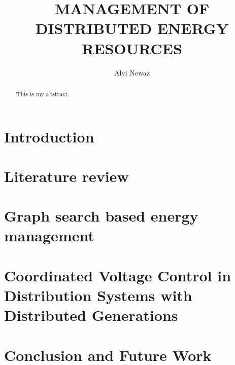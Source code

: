 \documentclass[11pt,expanded,copyright]{fsuthesis}
\title{MANAGEMENT OF DISTRIBUTED ENERGY RESOURCES}
\author{Alvi Newaz}
\begin{document}
\frontmatter
\maketitle
\makecommitteepage



\tableofcontents
\listoftables
\listoffigures



\begin{abstract}
This is my abstract.
\end{abstract}

\mainmatter

\chapter{Introduction}
\section{}
\chapter{Literature review}

\chapter{Graph search based energy management} \label{A8_cahp}


\chapter{Coordinated Voltage Control in Distribution
Systems with Distributed Generations} \label{CVC}


\chapter{Conclusion and Future Work}
\end{document}
